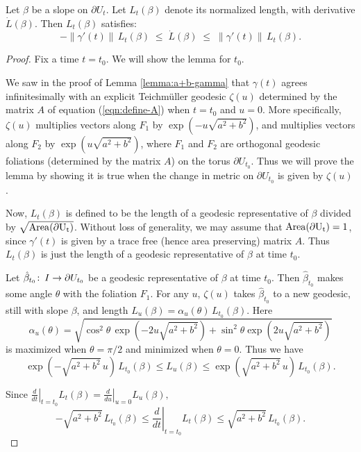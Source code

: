 \begin{lemma}
	Let $\beta$ be a slope on $\partial U_t$.  Let $L_t(\beta)$ denote
	its normalized length, with derivative $\dot{L}(\beta)$. Then
	$L_t(\beta)$ satisfies:
\begin{equation}
  -\|\gamma'(t)\| \, L_t(\beta) \;\leq\; \dot{L}(\beta) \;\leq\;
   \|\gamma'(t)\| \,L_t(\beta).
  \label{eqn:norm-length-L}
\end{equation}
\label{lemma:ldot-bound}
\end{lemma}

\begin{proof}
Fix a time $t=t_0$.  We will show the lemma for $t_0$.

We saw in the proof of Lemma \ref{lemma:a+b-gamma} that $\gamma(t)$
agrees infinitesimally with an explicit Teichm\"uller geodesic
$\zeta(u)$ determined by the matrix $A$ of equation
(\ref{eqn:define-A}) when $t=t_0$ and $u=0$.  More specifically,
$\zeta(u)$ multiplies vectors along $F_1$ by
$\exp(-u\sqrt{a^2+b^2})$, and multiplies vectors along $F_2$ by
$\exp(u\sqrt{a^2+b^2})$, where $F_1$ and $F_2$ are orthogonal
geodesic foliations (determined by the matrix $A$) on the torus
$\partial U_{t_0}$.  Thus we will prove the lemma by showing it is
true when the change in metric on $\partial U_{t_0}$ is given by
$\zeta(u)$.

Now, $L_t(\beta)$ is defined to be the length of a geodesic
representative of $\beta$ divided by $\sqrt{\rm{Area}(\partial U_t)}$.
Without loss of generality, we may assume that $\rm{Area}(\partial
U_t) = 1$, since $\gamma'(t)$ is given by a trace free (hence area
preserving) matrix $A$.  Thus $L_t(\beta)$ is just the length of a
geodesic representative of $\beta$ at time $t_0$.

Let $\hat{\beta}_{t_0}\colon\thinspace I \to \partial U_{t_0}$ be a geodesic
representative of $\beta$ at time $t_0$.  Then $\hat{\beta}_{t_0}$
makes some angle $\theta$ with the foliation $F_1$.  For any $u$,
$\zeta(u)$ takes $\hat{\beta}_{t_0}$ to a new geodesic, still with
slope $\beta$, and length $L_u(\beta) = \alpha_u(\theta) \,
L_{t_0}(\beta)$.  Here
$$\alpha_u(\theta)
= \sqrt{\cos^2\theta \,\exp(-2u\sqrt{a^2+b^2}) +\sin^2\theta \exp(2u\sqrt{a^2+b^2})}$$
is maximized when $\theta=\pi/2$ and minimized when $\theta=0$.  Thus
we have
$$\exp(-\sqrt{a^2+b^2}\,u)\,L_{t_0}(\beta) \leq L_u(\beta) \leq
\exp(\sqrt{a^2+b^2}\,u) \,L_{t_0}(\beta).$$

Since $\left.\frac{d}{dt}\right|_{t=t_0} L_t(\beta) =
\left.\frac{d}{du}\right|_{u=0} L_u(\beta),$
$$-\sqrt{a^2+b^2} \, L_{t_0}(\beta) \leq \left.\frac{d}{dt}\right|_{t=t_0}
L_t(\beta) \leq \sqrt{a^2+b^2}\, L_{t_0}(\beta).$$
\end{proof}

